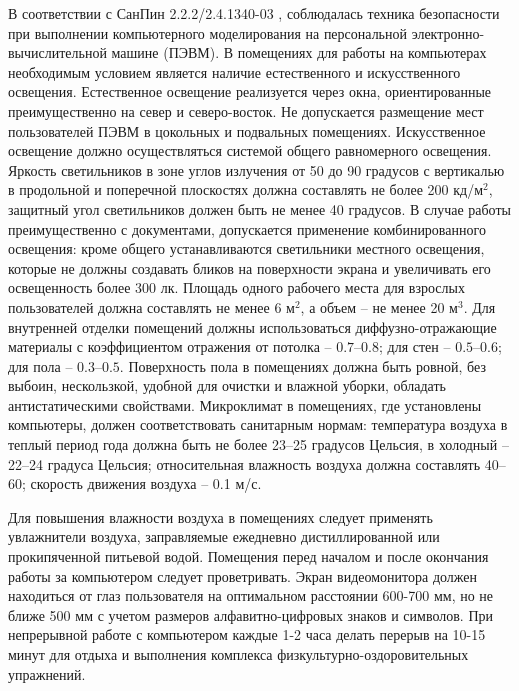 \SafetyRules
В соответствии с СанПин 2.2.2/2.4.1340-03 \cite{SanPin}, соблюдалась
техника безопасности при выполнении компьютерного моделирования на
персональной электронно-вычислительной машине (ПЭВМ). В помещениях для
работы на компьютерах необходимым условием является наличие естественного и
искусственного освещения.  Естественное освещение реализуется через окна,
ориентированные преимущественно на север и северо-восток. Не допускается
размещение мест пользователей ПЭВМ в цокольных и подвальных помещениях.
Искусственное освещение должно осуществляться системой общего равномерного
освещения. Яркость светильников в зоне углов излучения от 50 до 90 градусов
с вертикалью в продольной и поперечной плоскостях должна составлять не
более 200 кд/м$^2$, защитный угол светильников должен быть не менее 40
градусов. В случае работы преимущественно с документами, допускается
применение комбинированного освещения: кроме общего устанавливаются
светильники местного освещения, которые не должны создавать бликов на
поверхности экрана и увеличивать его освещенность более 300 лк.  Площадь
одного рабочего места для взрослых пользователей должна составлять не менее
6 м$^2$, а объем – не менее 20 м$^3$.  Для внутренней отделки помещений
должны использоваться диффузно-отражающие материалы с коэффициентом
отражения от потолка – $0.7–0.8$; для стен – $0.5–0.6$; для пола –
$0.3–0.5$. Поверхность пола в помещениях должна быть ровной, без выбоин,
нескользкой, удобной для очистки и влажной уборки, обладать
антистатическими свойствами. Микроклимат в помещениях, где установлены
компьютеры, должен соответствовать санитарным нормам: температура воздуха в
теплый период года должна быть не более 23–25 градусов Цельсия, в холодный
– 22–24 градуса Цельсия; относительная влажность воздуха должна составлять
40–60; скорость движения воздуха – 0.1 м/с.

Для повышения влажности воздуха в помещениях следует применять увлажнители
воздуха, заправляемые ежедневно дистиллированной или прокипяченной питьевой
водой. Помещения перед началом и после окончания работы за компьютером
следует проветривать.  Экран видеомонитора должен находиться от глаз
пользователя на оптимальном расстоянии 600-700 мм, но не ближе 500 мм с
учетом размеров алфавитно-цифровых знаков и символов. При непрерывной
работе с компьютером каждые 1-2 часа делать перерыв на 10-15 минут для
отдыха и выполнения комплекса физкультурно-оздоровительных упражнений.